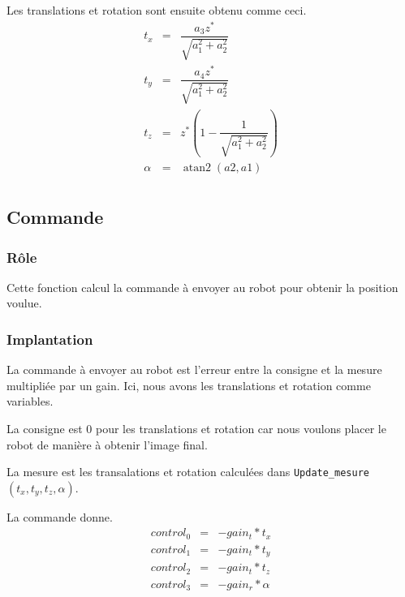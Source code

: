 \documentclass[11pt,a4paper]{report}
\DeclareMathOperator{\atantwo}{atan2}
\begin{document}
			Les translations et rotation sont ensuite obtenu comme ceci.
			\[
			\begin{matrix}
				t_x & = & \dfrac{a_3z^*}{\sqrt{a_1^2+a_2^2}}\\
				t_y & = & \dfrac{a_4z^*}{\sqrt{a_1^2+a_2^2}}\\
				t_z & = & z^*(1-\dfrac{1}{\sqrt{a_1^2+a_2^2}})\\
				\alpha & = & \atantwo(a2,a1)\\
			\end{matrix}
			\]

	\subsection*{Commande}
		\subsubsection{Rôle}
			Cette fonction calcul la commande à envoyer au robot pour obtenir la position voulue.

		\subsubsection{Implantation}
			La commande à envoyer au robot est l'erreur entre la consigne et la mesure multipliée par un gain. Ici, nous avons les translations et rotation comme variables.

			La consigne est 0 pour les translations et rotation car nous voulons placer le robot de manière à obtenir l'image final.

			La mesure est les transalations et rotation calculées dans \texttt{Update\_mesure} $(t_x, t_y, t_z, \alpha)$.

			La commande donne.
			\[
			\begin{matrix}
				control_0 & = & -gain_t*t_x\\
				control_1 & = & -gain_t*t_y\\
			  control_2 & = & -gain_t*t_z\\
				control_3 & = & -gain_r*\alpha\\
			\end{matrix}
			\]
			
\end{document}
